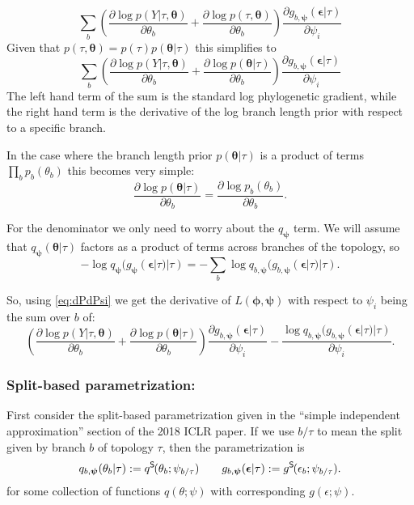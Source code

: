 \documentclass{article}
\newcommand{\qSplit}{q^\textsf{S}\hspace{-1pt}}
\newcommand{\gSplit}{g^\textsf{S}\hspace{-1pt}}
\begin{document}
\begin{equation}
    \sum_b
    \left(
        \frac{\partial \log p(Y | \tau, \bm\theta)}{\partial \theta_b}
        +
        \frac{\partial \log p(\tau, \bm\theta)}{\partial \theta_b}
    \right)
    \frac{\partial g_{b,\bm\psi}(\bm\epsilon | \tau)}{\partial \psi_i}
    \label{eq:dLdPsi}
\end{equation}
Given that $p(\tau, \bm\theta) = p(\tau) p(\bm\theta | \tau)$ this simplifies to
\begin{equation}
    \sum_b
    \left(
        \frac{\partial \log p(Y | \tau, \bm\theta)}{\partial \theta_b}
        +
        \frac{\partial \log p(\bm\theta | \tau)}{\partial \theta_b}
    \right)
    \frac{\partial g_{b,\bm\psi}(\bm\epsilon | \tau)}{\partial \psi_i}
    \label{eq:dPdPsi}
\end{equation}
The left hand term of the sum is the standard log phylogenetic gradient, while the right hand term is the derivative of the log branch length prior with respect to a specific branch.

In the case where the branch length prior $p(\bm\theta | \tau)$ is a product of terms $\prod_b p_b(\theta_b)$ this becomes very simple:
\[
    \frac{\partial \log p(\bm\theta | \tau)}{\partial \theta_b} =
    \frac{\partial \log p_b(\theta_b)}{\partial \theta_b}.
\]

For the denominator we only need to worry about the $q_\bm\psi$ term.
We will assume that $q_\bm\psi(\bm\theta | \tau)$ factors as a product of terms across branches of the topology, so
\[
    - \log q_{\bm{\psi}}(g_{\bm{\psi}}(\bm{\epsilon}|\tau)|\tau) =
    - \sum_b \log q_{b, \bm{\psi}}(g_{b, \bm{\psi}}(\bm{\epsilon}|\tau)|\tau).
\]

So, using \eqref{eq:dPdPsi} we get the derivative of $L(\bm\phi, \bm\psi)$ with respect to $\psi_i$ being the sum over $b$ of:
\begin{equation*}
    \left(
        \frac{\partial \log p(Y | \tau, \bm\theta)}{\partial \theta_b}
        +
        \frac{\partial \log p(\bm\theta | \tau)}{\partial \theta_b}
    \right)
    \frac{\partial g_{b,\bm\psi}(\bm\epsilon | \tau)}{\partial \psi_i}
    - \frac{\log q_{b, \bm\psi}(g_{b, \bm\psi}(\bm\epsilon|\tau)|\tau)}{\partial \psi_i}.
\end{equation*}

\subsubsection*{Split-based parametrization:}
First consider the split-based parametrization given in the ``simple independent approximation'' section of the 2018 ICLR paper.
If we use $b \slash \tau$ to mean the split given by branch $b$ of topology $\tau$, then the parametrization is
\[
q_{b, \bm{\psi}}(\theta_b | \tau) := \qSplit(\theta_b; \psi_{b \slash \tau})
\qquad
g_{b,\bm\psi}(\bm\epsilon | \tau) := \gSplit(\epsilon_b; \psi_{b \slash \tau}).
\]
for some collection of functions $q(\theta; \psi)$ with corresponding $g(\epsilon; \psi)$.
\end{document}
